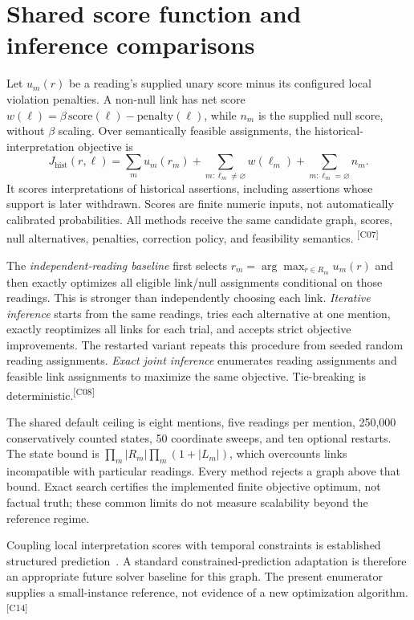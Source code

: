 \documentclass[10pt,letterpaper]{article}
\newcommand{\claim}[1]{\textsuperscript{\scriptsize[#1]}}
\begin{document}
\section{Shared score function and inference comparisons}
\label{sec:inference}
Let $u_m(r)$ be a reading's supplied unary score minus its configured local
violation penalties. A non-null link has net score
$w(\ell)=\beta\,\mathrm{score}(\ell)-\mathrm{penalty}(\ell)$, while $n_m$ is
the supplied null score, without $\beta$ scaling. Over semantically feasible
assignments, the historical-interpretation objective is
\begin{equation}
J_{\mathrm{hist}}(r,\ell)=\sum_m u_m(r_m)
+\sum_{m:\ell_m\ne\varnothing}w(\ell_m)
+\sum_{m:\ell_m=\varnothing}n_m. \label{eq:historical}
\end{equation}
It scores interpretations of historical assertions, including assertions whose
support is later withdrawn. Scores are finite numeric inputs, not automatically
calibrated probabilities. All methods receive the same candidate graph, scores,
null alternatives, penalties, correction policy, and feasibility semantics.
\claim{C07}

The \emph{independent-reading baseline} first selects
$r_m=\arg\max_{r\in R_m}u_m(r)$ and then exactly optimizes all eligible link/null
assignments conditional on those readings. This is stronger than independently
choosing each link. \emph{Iterative inference} starts from the same readings,
tries each alternative at one mention, exactly reoptimizes all links for each
trial, and accepts strict objective improvements. The restarted variant repeats
this procedure from seeded random reading assignments. \emph{Exact joint
inference} enumerates reading assignments and feasible link assignments to
maximize the same objective. Tie-breaking is deterministic.\claim{C08}

The shared default ceiling is eight mentions, five readings per mention,
250,000 conservatively counted states, 50 coordinate sweeps, and ten optional
restarts. The state bound is
$\prod_m|R_m|\prod_m(1+|L_m|)$, which overcounts links incompatible with
particular readings. Every method rejects a graph above that bound. Exact
search certifies the implemented finite objective optimum, not factual truth;
these common limits do not measure scalability beyond the reference regime.

Coupling local interpretation scores with temporal constraints is established
structured prediction~\cite{han-etal-2019-joint,ning-etal-2018-joint}. A standard
constrained-prediction adaptation is therefore an appropriate future solver
baseline for this graph. The present enumerator supplies a small-instance
reference, not evidence of a new optimization algorithm.\claim{C14}
\end{document}
